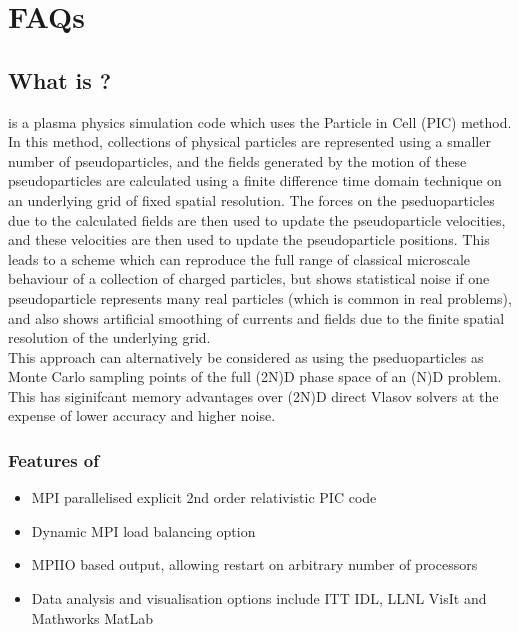 \documentclass[12pt,a4paper]{article}
\newcommand{\EPOCH}{{\color{warwickdark}\fontfamily{phv}\selectfont{EPOCH}}}
\begin{document}
{
  \selectfont
}
\selectfont%
\tableofcontents%
\newpage%
\DefineShortVerb{\#}
\section{FAQs}

\subsection{What is \EPOCH?}
{\EPOCH} is a plasma physics simulation code which uses the Particle in Cell (PIC)
method. In this method, collections of physical particles are represented using
a smaller number of pseudoparticles, and the fields generated by the motion of
these pseudoparticles are calculated using a finite difference time domain
technique on an underlying grid of fixed spatial resolution. The forces on the
pseduoparticles due to the calculated fields are then used to update the
pseudoparticle velocities, and these velocities are then used to update the
pseudoparticle positions. This leads to a scheme which can reproduce the full
range of classical microscale behaviour of a collection of charged particles,
but shows statistical noise if one pseudoparticle represents many real
particles (which is common in real problems), and also shows artificial
smoothing of currents and fields due to the finite spatial resolution of the
underlying grid.\\

This approach can alternatively be considered as using the pseduoparticles as
Monte Carlo sampling points of the full (2N)D phase space of an (N)D
problem. This has siginifcant memory advantages over (2N)D direct Vlasov
solvers at the expense of lower accuracy and higher noise.

\subsubsection{Features of {\EPOCH}}
\begin{itemize}
  \item MPI parallelised explicit 2nd order relativistic PIC code
  \item Dynamic MPI load balancing option
  \item MPIIO based output, allowing restart on arbitrary number of processors
  \item Data analysis and visualisation options include ITT IDL, LLNL VisIt
    and Mathworks MatLab
\end{itemize}
\end{document}

